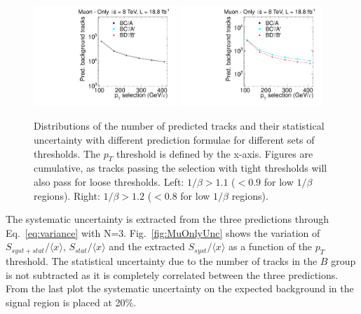 \begin{figure}
\begin{center}
\includegraphics[clip=false, trim=0.0cm 0cm 0.0cm 0cm, width=0.48\textwidth]{figures/muonly/Data8TeVCollisionPrediction_TOF110}
\includegraphics[clip=false, trim=0.0cm 0cm 0.0cm 0cm, width=0.48\textwidth]{figures/muonly/Data8TeVCollisionPrediction_TOF120}
\caption[Distributions of the number of predicted tracks with different prediction formulae for different sets of thresholds in the \muononly\ analysis.]
{Distributions of the number of predicted tracks and their statistical uncertainty with different prediction formulae for different sets of thresholds.
The $p_{T}$ threshold is defined by the x-axis.
Figures are cumulative, as tracks passing the selection with tight thresholds will also pass for loose thresholds.
Left: $1/\beta>1.1$ ($<0.9$ for low $1/\beta$ regions). Right: $1/\beta>1.2$ ($<0.8$ for low $1/\beta$ regions).}
\label{fig:MuOnlycorrelation}
\end{center}
\end{figure}

The systematic uncertainty is extracted from the three predictions
through Eq.~\ref{eq:variance} with N=3.
Fig.~\ref{fig:MuOnlyUnc} shows the variation of
$S_{syst+stat}/\langle x \rangle $, $S_{stat}/ \langle x \rangle $ and the extracted $S_{syst}/ \langle x \rangle $
as a function of the $p_T$ threshold. The statistical uncertainty due to the number of tracks in the $B$ group is not subtracted as it is completely correlated
between the three predictions. From the last plot
the systematic uncertainty on the expected background in the signal
region is placed at 20\%.

